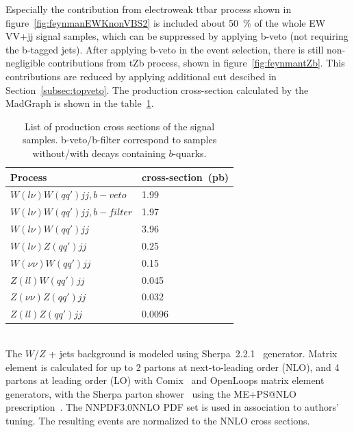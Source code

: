 Especially the contribution from electroweak ttbar process shown in figure~\ref{fig:feynmanEWKnonVBS2} is included about 50~\% of the whole EW VV+jj signal samples, which can be suppressed by applying b-veto (not requiring the b-tagged jets). After applying b-veto in the event selection, there is still non-negligible contributions from tZb process, shown in figure~\ref{fig:feynmantZb}. This contributions are reduced by applying additional cut descibed in Section~\ref{subsec:topveto}.
The production cross-section calculated by the MadGraph is shown in the table~\ref{tab:VBS_sig_samples}. \\ 
\begin{table}[!htbp]
\begin{center}
\small
\begin{tabular}{|l|l|}
\hline
Process & cross-section~(pb) \\
\hline
$W(l\nu)W(qq\prime)jj,b-veto$    &  1.99    \\
$W(l\nu)W(qq\prime)jj,b-filter$  &  1.97   \\
$W(l\nu)W(qq\prime)jj$            &  3.96   \\
$W(l\nu)Z(qq\prime)jj$            &  0.25   \\
$W(\nu\nu)W(qq\prime)jj$          &  0.15   \\
$Z(ll)W(qq\prime)jj$              &  0.045  \\
$Z(\nu\nu)Z(qq\prime)jj$          &  0.032  \\
$Z(ll)Z(qq\prime)jj$              &  0.0096 \\
\hline
\end{tabular}
\caption{List of production cross sections of the signal samples. b-veto/b-filter correspond to samples without/with decays containing $b$-quarks.}
\label{tab:VBS_sig_samples}
\end{center}
\end{table}

\noindent\textbf{} \\ 
The $W$/$Z$ + jets background is modeled using Sherpa~2.2.1~\cite{Gleisberg:2008ta} generator. 
Matrix element is calculated for up to 2 partons at next-to-leading order (NLO), and 4 partons at leading order (LO) with Comix~\cite{Gleisberg:2008fv} and OpenLoops\cite{Cascioli:2011va} matrix element generators, with the Sherpa parton shower~\cite{Schumann:2007mg} using the ME+PS@NLO prescription~\cite{Hoeche:2012yf}.
The NNPDF3.0NNLO PDF set is used in association to authors' tuning. The resulting events are normalized to the NNLO cross sections.

